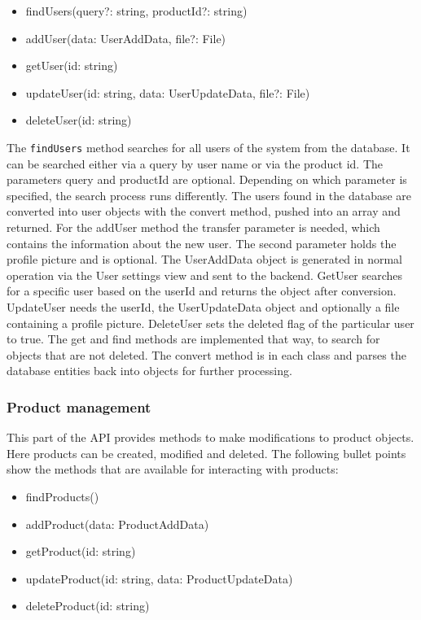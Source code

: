     \begin{itemize}
        \item findUsers(query?: string, productId?: string) 
        \item addUser(data: UserAddData, file?: File)
        \item getUser(id: string)
        \item updateUser(id: string, data: UserUpdateData, file?: File)
        \item deleteUser(id: string)
    \end{itemize}

    The \texttt{findUsers} method searches for all users of the system from the database. It can be searched either via a query by user name or via the product id. The parameters query and productId are optional. Depending on which parameter is specified, the search process runs differently. The users found in the database are converted into user objects with the convert method, pushed into an array and returned. For the addUser method the transfer parameter is needed, which contains the information about the new user. The second parameter holds the profile picture and is optional. The UserAddData object is generated in normal operation via the User settings view and sent to the backend. GetUser searches for a specific user based on the userId and returns the object after conversion. UpdateUser needs the userId, the UserUpdateData object and optionally a file containing a profile picture. DeleteUser sets the deleted flag of the particular user to true. The get and find methods are implemented that way, to search for objects that are not deleted. The convert method is in each class and parses the database entities back into objects for further processing.

    \subsubsection*{Product management}
    This part of the API provides methods to make modifications to product objects. Here products can be created, modified and deleted. The following bullet points show the methods that are available for interacting with products:

    \begin{itemize}
        \item findProducts()
        \item addProduct(data: ProductAddData)
        \item getProduct(id: string)
        \item updateProduct(id: string, data: ProductUpdateData)
        \item deleteProduct(id: string)
    \end{itemize}

